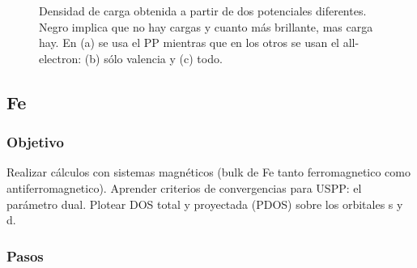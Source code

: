 \begin{figure}[H]
      \caption{Densidad de carga obtenida a partir de dos potenciales diferentes. Negro implica que no hay cargas y cuanto más brillante, mas carga hay. En (a) se usa el PP mientras que en los otros se usan el all-electron: (b) sólo valencia y (c) todo.}
  \end{figure}

\subsection{Fe}

\subsubsection{Objetivo}

  Realizar cálculos con sistemas magnéticos (bulk de Fe tanto ferromagnetico como antiferromagnetico). Aprender criterios de convergencias para USPP: el parámetro dual. Plotear DOS total y proyectada (PDOS) sobre los orbitales s y d.

\subsubsection{Pasos}

